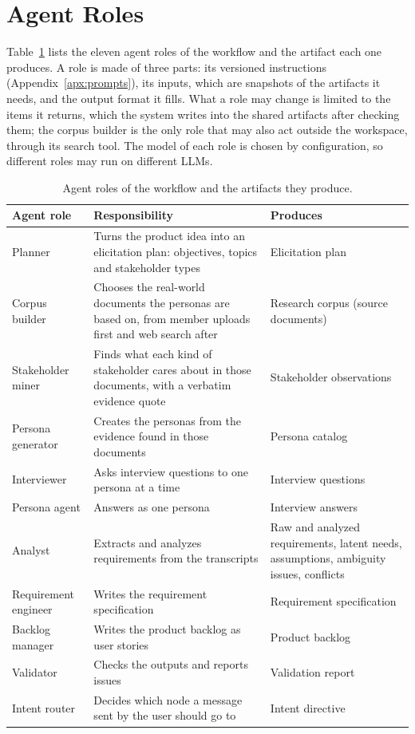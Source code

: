 \section{Agent Roles}
\label{sec:pa-agent-roles}

Table~\ref{tab:pa-agent-roles} lists the eleven agent roles of the workflow and the artifact each one produces. A role is made of three parts: its versioned instructions (Appendix~\ref{apx:prompts}), its inputs, which are snapshots of the artifacts it needs, and the output format it fills. What a role may change is limited to the items it returns, which the system writes into the shared artifacts after checking them; the corpus builder is the only role that may also act outside the workspace, through its search tool. The model of each role is chosen by configuration, so different roles may run on different LLMs.

\begin{table}[H]
    \centering
    \caption{Agent roles of the workflow and the artifacts they produce.}
    \label{tab:pa-agent-roles}
    \begin{tabularx}{\linewidth}{|l|X|X|}
        \hline
        \textbf{Agent role} & \textbf{Responsibility} & \textbf{Produces} \\
        \hline
        Planner & Turns the product idea into an elicitation plan: objectives, topics and stakeholder types & Elicitation plan \\
        Corpus builder & Chooses the real-world documents the personas are based on, from member uploads first and web search after & Research corpus (source documents) \\
        Stakeholder miner & Finds what each kind of stakeholder cares about in those documents, with a verbatim evidence quote & Stakeholder observations \\
        Persona generator & Creates the personas from the evidence found in those documents & Persona catalog \\
        Interviewer & Asks interview questions to one persona at a time & Interview questions \\
        Persona agent & Answers as one persona & Interview answers \\
        Analyst & Extracts and analyzes requirements from the transcripts & Raw and analyzed requirements, latent needs, assumptions, ambiguity issues, conflicts \\
        Requirement engineer & Writes the requirement specification & Requirement specification \\
        Backlog manager & Writes the product backlog as user stories & Product backlog \\
        Validator & Checks the outputs and reports issues & Validation report \\
        Intent router & Decides which node a message sent by the user should go to & Intent directive \\
        \hline
    \end{tabularx}
\end{table}
